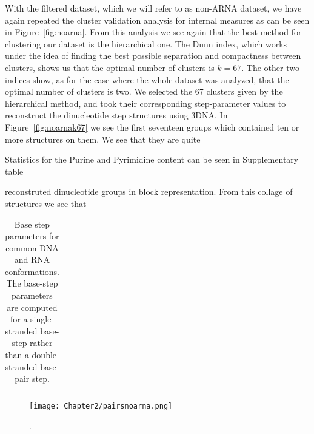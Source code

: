 With  the filtered dataset,  which we  will refer  to as  non-ARNA
dataset, we  have again repeated the cluster validation analysis for
internal measures as can be seen in Figure~\ref{fig:noarna}. From this
analysis we see again that the best method for clustering our dataset
is the hierarchical one. The Dunn index, which
works under the idea of finding the best possible separation and
compactness between clusters, shows us that the optimal number of
clusters is $k=67$. The other two indices show, as for the case where
the whole dataset was analyzed, that the optimal number of clusters is
two.
We selected the 67 clusters given by the hierarchical method, and took
their corresponding step-parameter values to reconstruct the
dinucleotide step structures using 3DNA. In Figure~\ref{fig:noarnak67}
we see the first seventeen groups which contained ten or more
structures on them. We see that they are quite 


Statistics for the Purine and Pyrimidine content
can be seen in Supplementary table ~


reconstruted dinucleotide groups in block
representation. From this collage of structures we see that



\begin{table}[htbp]
\begin{center}
{\small
\begin{tabular}{p{2cm}|c|c|c|c|c|c|c}
\hline


\end{tabular}
}
\caption{Base step parameters for common DNA and RNA
  conformations. The base-step parameters are computed for
  a single-stranded base-step rather than a double-stranded base-pair step.}
\end{center}
\label{tab:conformations}
\end{table}






\begin{figure}
\centering
\texttt{[image: Chapter2/pairsnoarna.png]}
\caption{. 
  }
\label{fig:pairnoarna}
\end{figure}






